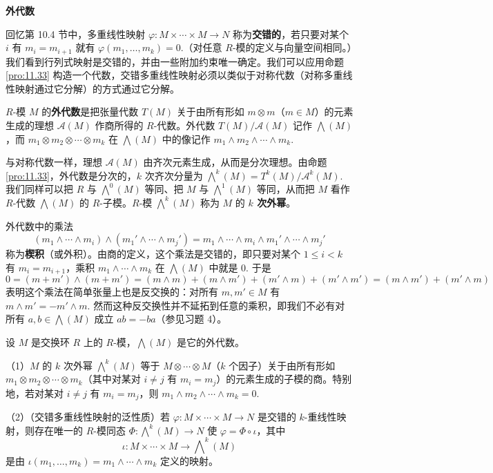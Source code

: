 \noindent\textbf{外代数}

回忆第 10.4 节中，多重线性映射 \(\varphi : M \times \cdots \times M \to N\) 称为\textbf{交错的}，若只要对某个 \(i\) 有 \(m_i = m_{i+1}\) 就有 \(\varphi(m_1, \ldots, m_k) = 0\).（对任意 \(R\)-模的定义与向量空间相同。）我们看到行列式映射是交错的，并由一些附加约束唯一确定。我们可以应用命题 \ref{pro:11.33} 构造一个代数，交错多重线性映射必须以类似于对称代数（对称多重线性映射通过它分解）的方式通过它分解。

\begin{definition}
\(R\)-模 \(M\) 的\textbf{外代数}是把张量代数 \(T(M)\) 关于由所有形如 \(m \otimes m\)（\(m \in M\)）的元素生成的理想 \(\mathcal{A}(M)\) 作商所得的 \(R\)-代数。外代数 \(T(M)/\mathcal{A}(M)\) 记作 \(\bigwedge(M)\)，而 \(m_1 \otimes m_2 \otimes \cdots \otimes m_k\) 在 \(\bigwedge(M)\) 中的像记作 \(m_1 \wedge m_2 \wedge \cdots \wedge m_k\).
\end{definition}

与对称代数一样，理想 \(\mathcal{A}(M)\) 由齐次元素生成，从而是分次理想。由命题 \ref{pro:11.33}，外代数是分次的，\(k\) 次齐次分量为 \(\bigwedge^k(M) = T^k(M)/\mathcal{A}^k(M)\). 我们同样可以把 \(R\) 与 \(\bigwedge^0(M)\) 等同、把 \(M\) 与 \(\bigwedge^1(M)\) 等同，从而把 \(M\) 看作 \(R\)-代数 \(\bigwedge(M)\) 的 \(R\)-子模。\(R\)-模 \(\bigwedge^k(M)\) 称为 \(M\) 的 \textbf{\(k\) 次外幂}。

外代数中的乘法
\[
(m_1 \wedge \cdots \wedge m_i) \wedge (m_1' \wedge \cdots \wedge m_j') = m_1 \wedge \cdots \wedge m_i \wedge m_1' \wedge \cdots \wedge m_j'
\]
称为\textbf{楔积}（或外积）。由商的定义，这个乘法是交错的，即只要对某个 \(1 \leq i < k\) 有 \(m_i = m_{i+1}\)，乘积 \(m_1 \wedge \cdots \wedge m_k\) 在 \(\bigwedge(M)\) 中就是 0. 于是
\[
0 = (m+m') \wedge (m+m') = (m \wedge m)+(m \wedge m')+(m' \wedge m)+(m' \wedge m') = (m \wedge m')+(m' \wedge m)
\]
表明这个乘法在简单张量上也是反交换的：对所有 \(m, m' \in M\) 有 \(m \wedge m' = -m' \wedge m\). 然而这种反交换性并不延拓到任意的乘积，即我们不必有对所有 \(a, b \in \bigwedge(M)\) 成立 \(ab = -ba\)（参见习题 4）。

\begin{theorem}\label{thm:11.36}
设 \(M\) 是交换环 \(R\) 上的 \(R\)-模，\(\bigwedge(M)\) 是它的外代数。

（1）\(M\) 的 \(k\) 次外幂 \(\bigwedge^k(M)\) 等于 \(M \otimes \cdots \otimes M\)（\(k\) 个因子）关于由所有形如 \(m_1 \otimes m_2 \otimes \cdots \otimes m_k\)（其中对某对 \(i \neq j\) 有 \(m_i = m_j\)）的元素生成的子模的商。特别地，若对某对 \(i \neq j\) 有 \(m_i = m_j\)，则 \(m_1 \wedge m_2 \wedge \cdots \wedge m_k = 0\).

（2）（交错多重线性映射的泛性质）若 \(\varphi : M \times \cdots \times M \to N\) 是交错的 \(k\)-重线性映射，则存在唯一的 \(R\)-模同态 \(\Phi : \bigwedge^k(M) \to N\) 使 \(\varphi = \Phi \circ \iota\)，其中
\[
\iota : M \times \cdots \times M \to \bigwedge\nolimits^k(M)
\]
是由 \(\iota(m_1, \ldots, m_k) = m_1 \wedge \cdots \wedge m_k\) 定义的映射。
\end{theorem}

